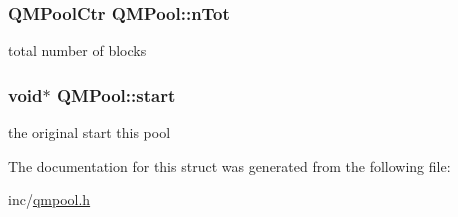\subsubsection[{\texorpdfstring{n\+Tot}{nTot}}]{\setlength{\rightskip}{0pt plus 5cm}Q\+M\+Pool\+Ctr Q\+M\+Pool\+::n\+Tot}\hypertarget{structQMPool_a429751e99a581e4fd21665b0cc58a225}{}\label{structQMPool_a429751e99a581e4fd21665b0cc58a225}
total number of blocks 
\subsubsection[{\texorpdfstring{start}{start}}]{\setlength{\rightskip}{0pt plus 5cm}void$\ast$ Q\+M\+Pool\+::start}\hypertarget{structQMPool_ad0834404a27a4260898e927fd1e03925}{}\label{structQMPool_ad0834404a27a4260898e927fd1e03925}
the original start this pool 

The documentation for this struct was generated from the following file\+:\begin{DoxyCompactItemize}
\item 
inc/\hyperlink{qmpool_8h}{qmpool.\+h}\end{DoxyCompactItemize}

